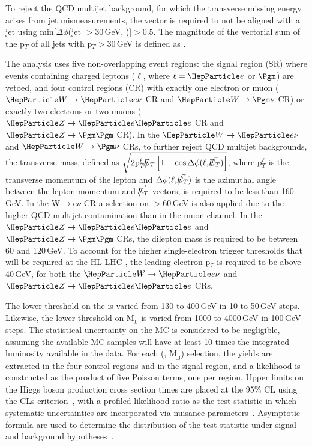 \documentclass[../report.tex]{subfiles}
\begin{document}
To reject the QCD multijet background, for which the transverse
missing energy arises from jet mismeasurements, the \METvec vector is
required to not be aligned with a jet using min$[\Delta\phi$(jet
\ptvec$>30$\,GeV, \METvec)]$>0.5$. The magnitude of the vectorial sum of
the p$_{T}$ of all jets with p$_{T}>30$\,GeV is defined as \MHT.

The analysis uses five non-overlapping event regions: the signal
region (SR) where events containing charged leptons ($\ell$, where
$\ell=\Pe$ or $\Pgm$) are vetoed, and four control regions (CR) with
exactly one electron or muon ($\PW\rightarrow\Pe\nu$ CR and
$\PW\rightarrow\Pgm\nu$ CR) or exactly two electrons or two muons
($\PZ\rightarrow\Pe\Pe$ CR and $\PZ\rightarrow\Pgm\Pgm$ CR).  In the
$\PW\rightarrow\Pe\nu$ and $\PW\rightarrow\Pgm\nu$ CRs, to further
reject QCD multijet backgrounds, the transverse mass, defined as
$\sqrt{2\pt^{\ell}\MET\left[1
- \cos{\Delta\phi(\ell,\METvec)}\right]}$, where p$_{T}^{\ell}$ is the
transverse momentum of the lepton and $\Delta\phi(\ell,\METvec)$ is
the azimuthal angle between the lepton momentum and $\METvec$ vectors,
is required to be less than 160\,GeV. In the W$\rightarrow$e$\nu$ CR a
selection on \MET$>60$\,GeV is also applied due to the higher QCD
multijet contamination than in the muon channel. In the
$\PZ\rightarrow\Pe\Pe$ and $\PZ\rightarrow\Pgm\Pgm$ CRs, the dilepton
mass is required to be between 60 and 120\,GeV. To account for the
higher single-electron trigger thresholds that will be required at the
HL-LHC , the leading electron p$_{T}$ is required to be above 40\,GeV,
for both the $\PW\rightarrow\Pe\nu$ and $\PZ\rightarrow\Pe\Pe$ CRs.

The lower threshold on the \MET is varied from 130 to 400\,GeV in 10 to
50\,GeV steps. Likewise, the lower threshold on M$_{\text{jj}}$ is
varied from 1000 to 4000\,GeV in 100\,GeV steps. The statistical
uncertainty on the MC is considered to be negligible, assuming the
available MC samples will have at least 10 times the integrated
luminosity available in the data.  For each (\MET, M$_{\text{jj}}$)
selection, the yields are extracted in the four control regions and in
the signal region, and a likelihood is constructed as the product of
five Poisson terms, one per region.  Upper limits on the Higgs boson
production cross section times
\BHinv are placed at the 95\% CL using the CLs
criterion~\cite{Read:2002hq,Junk:1999kv,Dittmaier:2012vm}, with a profiled
likelihood ratio as the test statistic in which systematic
uncertainties are incorporated via nuisance
parameters~\cite{Chatrchyan:2013lba,CMS-NOTE-2011-005}. Asymptotic
formula are used to determine the distribution of the test statistic
under signal and background hypotheses~\cite{Cowan:2010js}.
\end{document}
